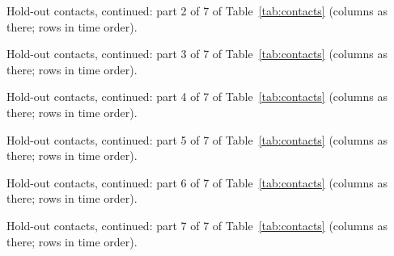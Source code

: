 \begin{table}[tp]
\centering
\small

\caption{Hold-out contacts, continued: part 2 of 7 of Table~\ref{tab:contacts} (columns as there; rows in time order).}
\label{tab:contacts-b}
\end{table}
\begin{table}[tp]
\centering
\small

\caption{Hold-out contacts, continued: part 3 of 7 of Table~\ref{tab:contacts} (columns as there; rows in time order).}
\label{tab:contacts-c}
\end{table}
\begin{table}[tp]
\centering
\small

\caption{Hold-out contacts, continued: part 4 of 7 of Table~\ref{tab:contacts} (columns as there; rows in time order).}
\label{tab:contacts-d}
\end{table}
\begin{table}[tp]
\centering
\small

\caption{Hold-out contacts, continued: part 5 of 7 of Table~\ref{tab:contacts} (columns as there; rows in time order).}
\label{tab:contacts-e}
\end{table}
\begin{table}[tp]
\centering
\small

\caption{Hold-out contacts, continued: part 6 of 7 of Table~\ref{tab:contacts} (columns as there; rows in time order).}
\label{tab:contacts-f}
\end{table}
\begin{table}[tp]
\centering
\small

\caption{Hold-out contacts, continued: part 7 of 7 of Table~\ref{tab:contacts} (columns as there; rows in time order).}
\label{tab:contacts-g}
\end{table}
